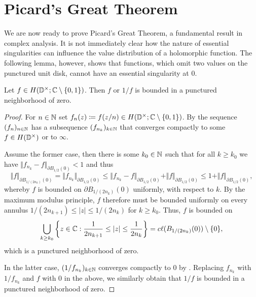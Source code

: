 \section{Picard's Great Theorem}
\label{sec:picards-great-theorem}

We are now ready to prove Picard's Great Theorem, a fundamental result in complex analysis. It is not immediately clear how the nature of essential singularities can influence the value distribution of a holomorphic function. The following lemma, however, shows that functions, which omit two values on the punctured unit disk, cannot have an essential singularity at $0$.

\begin{lemma} \label{lem:great-picard-bounded}
    Let $f \in H(\mathbb{D}^\times; \mathbb{C} \setminus \{ 0, 1 \})$. Then $f$ or $1/f$ is bounded in a punctured neighborhood of zero.
\end{lemma}

\begin{proof}
    For $n \in \mathbb{N}$ set $f_n(z) \coloneqq f(z / n) \in H(\mathbb{D}^\times; \mathbb{C} \setminus \{ 0, 1 \})$. By  the sequence $(f_n)_{n \in \mathbb{N}}$ has a subsequence $(f_{n_k})_{k \in \mathbb{N}}$ that converges compactly to some $f \in H(\mathbb{D}^\times)$ or to $\infty$.

    Assume the former case, then there is some $k_0 \in \mathbb{N}$ such that for all $k \geq k_0$ we have $ \Vert f_{n_k} - f \Vert_{\partial B_{1/2}(0)} < 1 $ and thus
    \begin{equation*}
        \Vert f \Vert_{\partial B_{1/(2n_k)}(0)} = \Vert f_{n_k} \Vert_{\partial B_{1/2}(0)} \leq \Vert f_{n_k} - f \Vert_{\partial B_{1/2}(0)} + \Vert f \Vert_{\partial B_{1/2}(0)} \leq 1 + \Vert f \Vert_{\partial B_{1/2}(0)},
    \end{equation*}
    whereby $f$ is bounded on $\partial B_{1/(2n_k)}(0)$ uniformly, with respect to $k$. By the maximum modulus principle, $f$ therefore must be bounded uniformly on every annulus $1 / (2 n_{k + 1}) \leq \vert z \vert \leq 1 / (2 n_k)$ for $k \geq k_0$. Thus, $f$ is bounded on
    $$ \bigcup_{k \geq k_0} \left\{ z \in \mathbb{C} : \frac{1}{2 n_{k+1}} \leq \vert z \vert \leq \frac{1}{2 n_k} \right\} = c\ell({B_{1/(2n_k)}(0)}) \setminus \{ 0 \}, $$
    which is a punctured neighborhood of zero.

    In the latter case, $(1 / f_{n_k})_{k \in \mathbb{N}}$ converges compactly to $0$ by . Replacing $f_{n_k}$ with $1 / f_{n_k}$ and $f$ with $0$ in the above, we similarly obtain that $1 / f$ is bounded in a punctured neighborhood of zero.
\end{proof}

